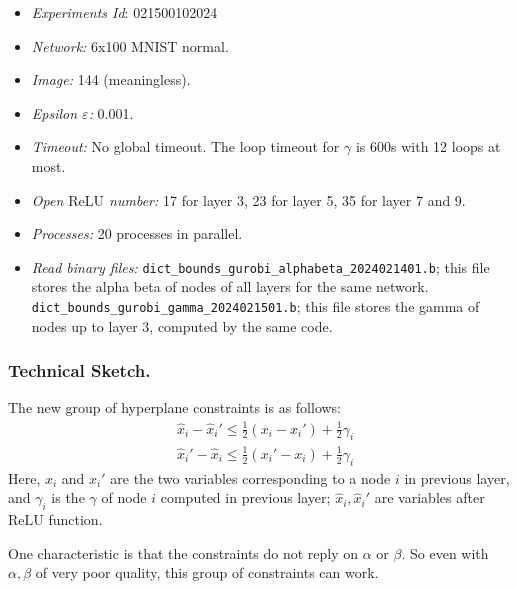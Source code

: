 \documentclass{llncs}
\newcommand{\ReLU}{\mathrm{ReLU}}
\begin{document}
\begin{itemize}
	\item \emph{Experiments Id}: 021500102024
	
	\item\emph{Network:} 6x100 MNIST normal. 
	
	\item\emph{Image:} 144 (meaningless).
	
	\item\emph{Epsilon $\varepsilon$:} 0.001.
	
	\item\emph{Timeout:} No global timeout. The loop timeout for $\gamma$ is 600s with 12 loops at most.
	
	\item\emph{Open $\ReLU$ number:} 17 for layer 3, 23 for layer 5, 35 for layer 7 and 9. 
	
	\item\emph{Processes:} 20 processes in parallel.
	
	\item\emph{Read binary files:} \verb*|dict_bounds_gurobi_alphabeta_2024021401.b|; this file stores the alpha beta of nodes of all layers for the same network. \verb*|dict_bounds_gurobi_gamma_2024021501.b|; this file stores the gamma of nodes up to layer 3, computed by the same code.
\end{itemize}







\subsubsection*{Technical Sketch.}


The new group of hyperplane constraints is as follows: \begin{align*}
	&\hat{x}_i - \hat{x}_i' \leq \frac{1}{2} (x_i-x_i') + \frac{1}{2} \gamma_i\\
	&\hat{x}_i' - \hat{x}_i \leq \frac{1}{2} (x_i'-x_i) + \frac{1}{2}\gamma_i
\end{align*} Here, $x_i$ and $x_i'$ are the two variables corresponding to a node $i$ in previous layer, and $\gamma_i$ is the $\gamma$ of node $i$ computed in previous layer; $\hat{x}_i,\hat{x}_i'$ are variables after $\ReLU$ function.

One characteristic is that the constraints do not reply on $\alpha$ or $\beta$. So even with $\alpha,\beta$ of very poor quality, this group of constraints can work.
\end{document}
